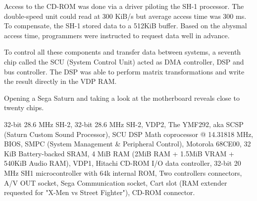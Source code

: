 \par
Access to the CD-ROM was done via a driver piloting the SH-1 processor. The double-speed unit could read at 300 KiB/s but average access time was 300 ms. To compensate, the SH-1 stored data to a 512KiB buffer. Based on the abysmal access time, programmers were instructed to request data well in advance.\\
\par
To control all these components and transfer data between systems, a seventh chip called the SCU (System Control Unit) acted as DMA controller, DSP and bus controller. The DSP was able to perform matrix transformations and write the result directly in the VDP RAM.\\
\par


\pagebreak





\par
Opening a Sega Saturn and taking a look at the motherboard reveals close to twenty chips.\\
\par
{} 32-bit 28.6 MHz SH-2, 
 32-bit 28.6 MHz SH-2, 
 VDP2, 
 The YMF292, aka SCSP (Saturn Custom Sound Processor), 
 SCU DSP Math coprocessor @ 14.31818 MHz, 
 BIOS, 
 SMPC (System Management \& Peripheral Control), 
 Motorola 68CE00, 
 32 KiB Battery-backed SRAM, 
 4 MiB RAM (2MiB RAM + 1.5MiB VRAM + 540KiB Audio RAM), 
 VDP1, 
 Hitachi CD-ROM I/O data controller, 
 32-bit 20 MHz SH1  microcontroller with 64k internal ROM, 
 Two controllers connectors, 
 A/V OUT socket,  
 Sega Communication socket,  
 Cart slot (RAM extender requested for "X-Men vs Street Fighter"), 
 CD-ROM connector.







